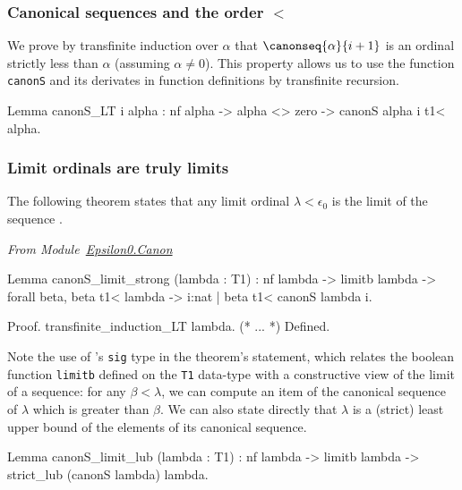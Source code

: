 \subsubsection{Canonical sequences and the order $<$}


We prove by transfinite induction over $\alpha$ that $\canonseq{\alpha}{i+1}$ is an ordinal strictly less than $\alpha$ (assuming $\alpha\not=0$). This property allows us to use the function \texttt{canonS} and its derivates in function definitions by transfinite recursion.

\label{lemma:canonS_LT}
\begin{Coqsrc}
Lemma canonS_LT i alpha :
  nf alpha -> alpha <> zero -> canonS alpha i t1<  alpha.
\end{Coqsrc}


\subsubsection{Limit ordinals are truly limits}
The following theorem states that any limit ordinal $\lambda<\epsilon_0$ 
is the limit of the sequence .


\vspace{4pt}
\emph{From Module~\href{../theories/html/hydras.Epsilon0.Canon.html\#canonS_limit_strong}{Epsilon0.Canon}}


\begin{Coqsrc}
Lemma canonS_limit_strong (lambda : T1) : 
     nf lambda ->
     limitb lambda  ->
     forall beta, beta t1< lambda ->
                  {i:nat | beta t1< canonS lambda i}.

Proof.
  transfinite_induction_LT lambda.
  (* ... *)
Defined.
\end{Coqsrc}

\label{lemma:canonS-limit}


Note the use of \coq's \texttt{sig} type in the theorem's statement, which
relates the boolean function \texttt{limitb} defined on the \texttt{T1} data-type with a constructive view of the limit of a sequence: for any $\beta<\lambda$, we can compute an item of the canonical sequence of $\lambda$ which is greater than $\beta$.
We can also state directly that $\lambda$ is a (strict) least upper bound of the elements of its canonical sequence.


\begin{Coqsrc}
Lemma canonS_limit_lub (lambda : T1) :
  nf lambda -> limitb lambda  ->
  strict_lub (canonS lambda) lambda.
\end{Coqsrc}

